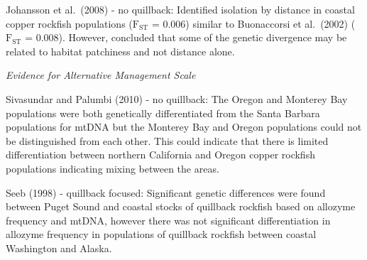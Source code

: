 \documentclass[11pt,
  english,
  letterpaper,
]{article}
\begin{document}
\leavevmode\tagmcend\tagstructend\par


Johansson et al.~{(2008)\leavevmode\tagmcend\tagstructend} - no quillback: Identified isolation by distance in coastal copper rockfish populations ({\(\text{F}_\text{ST}\)\leavevmode\tagmcend\tagstructend} = 0.006) similar to Buonaccorsi et al.~{(2002)\leavevmode\tagmcend\tagstructend} ({\(\text{F}_\text{ST}\)\leavevmode\tagmcend\tagstructend} = 0.008). However, concluded that some of the genetic divergence may be related to habitat patchiness and not distance alone.

\leavevmode\tagmcend\tagstructend\par


\emph{Evidence for Alternative Management Scale}

\leavevmode\tagmcend\tagstructend\par


Sivasundar and Palumbi {(2010)\leavevmode\tagmcend\tagstructend} - no quillback: The Oregon and Monterey Bay populations were both genetically differentiated from the Santa Barbara populations for mtDNA but the Monterey Bay and Oregon populations could not be distinguished from each other. This could indicate that there is limited differentiation between northern California and Oregon copper rockfish populations indicating mixing between the areas.

\leavevmode\tagmcend\tagstructend\par


Seeb {(1998)\leavevmode\tagmcend\tagstructend} - quillback focused: Significant genetic differences were found between Puget Sound and coastal stocks of quillback rockfish based on allozyme frequency and mtDNA, however there was not significant differentiation in allozyme frequency in populations of quillback rockfish between coastal Washington and Alaska.
\end{document}

